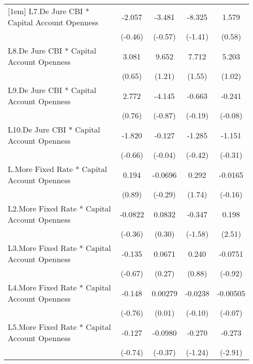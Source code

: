 {\begin{longtable}{l*{4}{c}}
[1em]
L7.De Jure CBI * Capital Account Openness&   -2.057         &   -3.481         &   -8.325         &    1.579         \\
                &  (-0.46)         &  (-0.57)         &  (-1.41)         &   (0.58)         \\
[1em]
L8.De Jure CBI * Capital Account Openness&    3.081         &    9.652         &    7.712         &    5.203         \\
                &   (0.65)         &   (1.21)         &   (1.55)         &   (1.02)         \\
[1em]
L9.De Jure CBI * Capital Account Openness&    2.772         &   -4.145         &   -0.663         &   -0.241         \\
                &   (0.76)         &  (-0.87)         &  (-0.19)         &  (-0.08)         \\
[1em]
L10.De Jure CBI * Capital Account Openness&   -1.820         &   -0.127         &   -1.285         &   -1.151         \\
                &  (-0.66)         &  (-0.04)         &  (-0.42)         &  (-0.31)         \\
[1em]
L.More Fixed Rate * Capital Account Openness&    0.194         &  -0.0696         &    0.292         &  -0.0165         \\
                &   (0.89)         &  (-0.29)         &   (1.74)         &  (-0.16)         \\
[1em]
L2.More Fixed Rate * Capital Account Openness&  -0.0822         &   0.0832         &   -0.347         &    0.198\sym{*}  \\
                &  (-0.36)         &   (0.30)         &  (-1.58)         &   (2.51)         \\
[1em]
L3.More Fixed Rate * Capital Account Openness&   -0.135         &   0.0671         &    0.240         &  -0.0751         \\
                &  (-0.67)         &   (0.27)         &   (0.88)         &  (-0.92)         \\
[1em]
L4.More Fixed Rate * Capital Account Openness&   -0.148         &  0.00279         &  -0.0238         & -0.00505         \\
                &  (-0.76)         &   (0.01)         &  (-0.10)         &  (-0.07)         \\
[1em]
L5.More Fixed Rate * Capital Account Openness&   -0.127         &  -0.0980         &   -0.270         &   -0.273\sym{**} \\
                &  (-0.74)         &  (-0.37)         &  (-1.24)         &  (-2.91)         \\

\end{longtable}}
